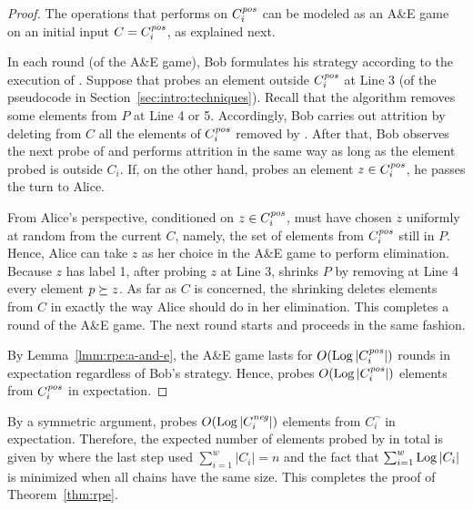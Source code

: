 \begin{proof}
    The operations that  performs on $C^\mathit{pos}_i$ can be modeled as an A\&E game on an initial input $C = C^\mathit{pos}_i$, as explained next.

    \vgap

    In each round (of the A\&E game), Bob formulates his strategy according to the execution of . Suppose that  probes an element outside $C^\mathit{pos}_i$ at Line 3 (of the pseudocode in Section~\ref{sec:intro:techniques}). Recall that the algorithm removes some elements from $P$ at Line 4 or 5. Accordingly, Bob carries out attrition by deleting from $C$ all the elements of $C^\mathit{pos}_i$ removed by . After that, Bob observes the next probe of  and performs attrition in the same way as long as the element probed is outside $C_i$. If, on the other hand,  probes an element $z \in C^\mathit{pos}_i$, he passes the turn to Alice.

    \vgap

    From Alice's perspective, conditioned on $z \in C^\mathit{pos}_i$,  must have chosen $z$ uniformly at random from the current $C$, namely, the set of elements from $C^\mathit{pos}_i$ still in $P$. Hence, Alice can take $z$ as her choice in the A\&E game to perform elimination. Because $z$ has label 1, after probing $z$ at Line 3,  shrinks $P$ by removing at Line 4 every element $p \succeq z$. As far as $C$ is concerned, the shrinking deletes elements from $C$ in exactly the way Alice should do in her elimination. This completes a round of the A\&E game. The next round starts and proceeds in the same fashion.

    \vgap

    By Lemma~\ref{lmm:rpe:a-and-e}, the A\&E game lasts for $O(\operatorname*{Log} |C^\mathit{pos}_i|)$ rounds in expectation regardless of Bob's strategy. Hence,  probes $O(\operatorname*{Log} |C^\mathit{pos}_i|)$ elements from $C^\mathit{pos}_i$ in expectation.
\end{proof}

By a symmetric argument,  probes $O(\operatorname*{Log} |C^\mathit{neg}_i|)$ elements from $C^\neg_i$ in expectation. Therefore, the expected number of elements probed by  in total is given by
where the last step used $\sum_{i=1}^w |C_i| = {n}$ {and the fact that $\sum_{i=1}^w \operatorname*{Log}|C_i|$ is minimized when all chains have the same size}.
This completes the proof of Theorem~\ref{thm:rpe}.

